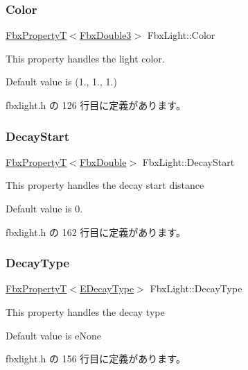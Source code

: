 \subsubsection{\texorpdfstring{Color}{Color}}
{\footnotesize\ttfamily \hyperlink{class_fbx_property_t}{Fbx\+PropertyT}$<$\hyperlink{fbxtypes_8h_ae0a96f14cde566774c7553aa7523b7a7}{Fbx\+Double3}$>$ Fbx\+Light\+::\+Color}

This property handles the light color.

Default value is (1., 1., 1.) 

 fbxlight.\+h の 126 行目に定義があります。

\mbox{\label{class_fbx_light_a33459f3a22c886508580c8879ee6cb54}} 
\subsubsection{\texorpdfstring{Decay\+Start}{DecayStart}}
{\footnotesize\ttfamily \hyperlink{class_fbx_property_t}{Fbx\+PropertyT}$<$\hyperlink{fbxtypes_8h_a171e72a1c46fc15c1a6c9c31948c1c5b}{Fbx\+Double}$>$ Fbx\+Light\+::\+Decay\+Start}

This property handles the decay start distance

Default value is 0. 

 fbxlight.\+h の 162 行目に定義があります。

\mbox{\label{class_fbx_light_aef58f45dfa9e83866792ed63b3e8ba21}} 
\subsubsection{\texorpdfstring{Decay\+Type}{DecayType}}
{\footnotesize\ttfamily \hyperlink{class_fbx_property_t}{Fbx\+PropertyT}$<$\hyperlink{class_fbx_light_a940254a9a826ab44a4cde044db1b3875}{E\+Decay\+Type}$>$ Fbx\+Light\+::\+Decay\+Type}

This property handles the decay type

Default value is e\+None 

 fbxlight.\+h の 156 行目に定義があります。

\mbox{\label{class_fbx_light_aac35b91a53647b958436f966ce65d7f7}} 
